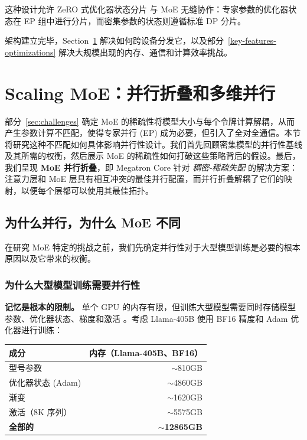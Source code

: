 \documentclass[10pt,logo,copyright]{nvidiatechreport_zh}
\begin{document}
这种设计允许 ZeRO 式优化器状态分片 \cite{rajbhandari2020zero} 与 MoE 无缝协作：专家参数的优化器状态在 EP 组中进行分片，而密集参数的状态则遵循标准 DP 分片。

架构建立完毕，Section~\ref{parallelism-strategies} 解决如何跨设备分发它，以及部分~\ref{key-features-optimizations} 解决大规模出现的内存、通信和计算效率挑战。

\section{Scaling MoE：并行折叠和多维并行}\label{parallelism-strategies}

部分~\ref{sec:challenges} 确定 MoE 的稀疏性将模型大小与每个令牌计算解耦，从而产生参数计算不匹配，使得专家并行 (EP) 成为必要，但引入了全对全通信。本节将研究这种不匹配如何具体影响并行性设计。我们首先回顾密集模型的并行性基线及其所需的权衡，然后展示 MoE 的稀疏性如何打破这些策略背后的假设。最后，我们呈现 \textbf{MoE 并行折叠}，即 Megatron Core 针对 \emph{稠密-稀疏失配} 的解决方案：注意力层和 MoE 层具有相互冲突的最佳并行配置，而并行折叠解耦了它们的映射，以便每个层都可以使用其最佳拓扑。

\subsection{为什么并行，为什么 MoE 不同}\label{sec:why-parallelism}

在研究 MoE 特定的挑战之前，我们先确定并行性对于大型模型训练是必要的根本原因以及它带来的权衡。

\subsubsection{为什么大型模型训练需要并行性}

\textbf{记忆是根本的限制。} 单个 GPU 的内存有限，但训练大型模型需要同时存储模型参数、优化器状态、梯度和激活 \cite{rasley2020deepspeed}。考虑 Llama-405B \cite{grattafiori2024llama3herdmodels,touvron2023llama,touvron2023llama2} 使用 BF16 精度和 Adam 优化器进行训练：

\begin{center}
\begin{tabular}{lr}
\toprule
\textbf{成分} & \textbf{内存（Llama-405B、BF16）} \\
\midrule
型号参数 & $\sim$810GB \\
优化器状态 (Adam) & $\sim$4860GB \\
渐变 & $\sim$1620GB \\
激活（8K 序列） & $\sim$5575GB \\
\midrule
\textbf{全部的} & \textbf{$\sim$12865GB} \\
\bottomrule
\end{tabular}
\end{center}
\end{document}
